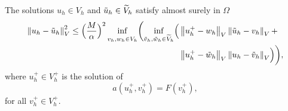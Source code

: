 \documentclass[10pt]{article}
\begin{document}
\begin{lemma}\label{lem:ConvergenceGeneral} The solutions $u_h \in V_h$ and $\tilde u_h \in \widetilde V_h$ satisfy almost surely in $\Omega$
	\begin{equation}
	\begin{aligned}
		\norm{u_h - \tilde u_h}_V^2 \leq \Bigl(\frac{M}{\alpha}\Bigr)^2 \finf{v_h, w_h \in V_h} \biggl(\finf{\tilde v_h, \tilde w_h \in \btilde V_h} \Bigl(&\norm{u_h^+ - w_h}_V \norm{\tilde u_h - v_h}_V + \\ 
		&\norm{u_h^+ - \tilde w_h}_V \norm{u_h - \tilde v_h}_V \Bigr)\biggr),
	\end{aligned}
	\end{equation}
	where $u_h^+ \in V_h^+$ is the solution of 
	\begin{equation}\label{eq:uHPlus}
		a(u_h^+ , v_h^+) = F(v_h^+),	
	\end{equation}
	for all $v_h^+ \in V_h^+$.
\end{lemma}
\end{document}
